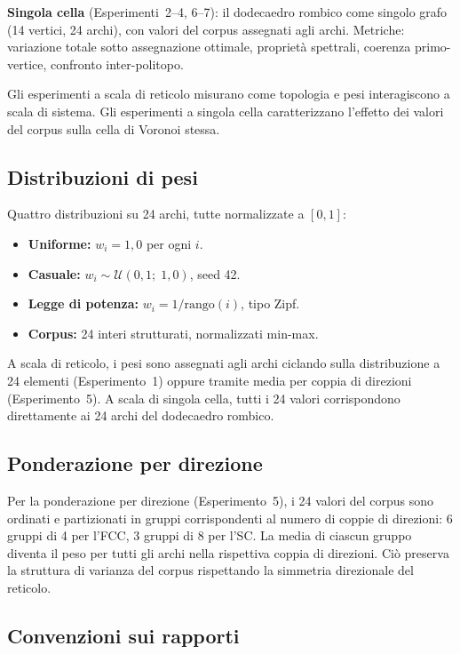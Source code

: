 \documentclass[11pt]{article}
\begin{document}
\textbf{Singola cella} (Esperimenti~2--4, 6--7): il dodecaedro rombico
come singolo grafo (14 vertici, 24 archi), con valori del corpus
assegnati agli archi. Metriche: variazione totale sotto assegnazione
ottimale, propriet\`a spettrali, coerenza primo-vertice, confronto
inter-politopo.

Gli esperimenti a scala di reticolo misurano come topologia e pesi
interagiscono a scala di sistema. Gli esperimenti a singola cella
caratterizzano l'effetto dei valori del corpus sulla cella di Voronoi
stessa.

\subsection{Distribuzioni di pesi}

Quattro distribuzioni su 24 archi, tutte normalizzate a $[0,1]$:

\begin{itemize}
  \item \textbf{Uniforme:} $w_i = 1{,}0$ per ogni $i$.
  \item \textbf{Casuale:} $w_i \sim \mathcal{U}(0{,}1;\; 1{,}0)$, seed 42.
  \item \textbf{Legge di potenza:} $w_i = 1/\text{rango}(i)$, tipo Zipf.
  \item \textbf{Corpus:} 24 interi strutturati, normalizzati min-max.
\end{itemize}

A scala di reticolo, i pesi sono assegnati agli archi ciclando sulla
distribuzione a 24 elementi (Esperimento~1) oppure tramite media per
coppia di direzioni (Esperimento~5). A scala di singola cella, tutti
i 24 valori corrispondono direttamente ai 24 archi del dodecaedro
rombico.

\subsection{Ponderazione per direzione}

Per la ponderazione per direzione (Esperimento~5), i 24 valori del
corpus sono ordinati e partizionati in gruppi corrispondenti al numero
di coppie di direzioni: 6 gruppi di 4 per l'FCC, 3 gruppi di 8 per
l'SC. La media di ciascun gruppo diventa il peso per tutti gli archi
nella rispettiva coppia di direzioni. Ci\`o preserva la struttura di
varianza del corpus rispettando la simmetria direzionale del reticolo.

\subsection{Convenzioni sui rapporti}
\end{document}
